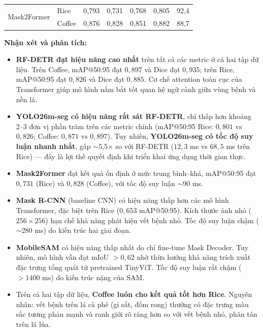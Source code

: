 \begin{table}[H]
{\begin{tabular}{llrrrrr}
            \midrule
            \multirow{2}{*}{Mask2Former}
                             & Rice             & 0,793                        & 0,731                           & 0,768                      & 0,805                      & 92,4                              \\
                             & Coffee           & 0,876                        & 0,828                           & 0,851                      & 0,882                      & 88,7                              \\
            \bottomrule
        \end{tabular}%
    }
    \label{tab:all_test_results}
\end{table}

\textbf{Nhận xét và phân tích:}

\begin{itemize}
    \item \textbf{RF-DETR đạt hiệu năng cao nhất} trên tất cả các metric ở cả hai tập dữ liệu. Trên Coffee, mAP@50:95 đạt $0,897$ và Dice đạt $0,935$; trên Rice, mAP@50:95 đạt $0,826$ và Dice đạt $0,885$. Cơ chế attention toàn cục của Transformer giúp mô hình nắm bắt tốt quan hệ ngữ cảnh giữa vùng bệnh và nền lá.

    \item \textbf{YOLO26m-seg có hiệu năng rất sát RF-DETR}, chỉ thấp hơn khoảng 2--3 đơn vị phần trăm trên các metric chính (mAP@50:95 Rice: $0,801$ vs $0,826$; Coffee: $0,871$ vs $0,897$). Tuy nhiên, \textbf{YOLO26m-seg có tốc độ suy luận nhanh nhất}, gấp $\sim$5,5× so với RF-DETR ($12,3$ ms vs $68,5$ ms trên Rice) --- đây là lợi thế quyết định khi triển khai ứng dụng thời gian thực.

    \item \textbf{Mask2Former} đạt kết quả ổn định ở mức trung bình--khá, mAP@50:95 đạt $0,731$ (Rice) và $0,828$ (Coffee), với tốc độ suy luận $\sim$90 ms.

    \item \textbf{Mask R-CNN} (baseline CNN) có hiệu năng thấp hơn các mô hình Transformer, đặc biệt trên Rice ($0,653$ mAP@50:95). Kích thước ảnh nhỏ ($256 \times 256$) hạn chế khả năng phát hiện vết bệnh nhỏ. Tốc độ suy luận chậm ($\sim$280 ms) do kiến trúc hai giai đoạn.

    \item \textbf{MobileSAM} có hiệu năng thấp nhất do chỉ fine-tune Mask Decoder. Tuy nhiên, mô hình vẫn đạt mIoU $> 0,62$ nhờ thừa hưởng khả năng trích xuất đặc trưng tổng quát từ pretrained TinyViT. Tốc độ suy luận rất chậm ($> 1400$ ms) do kiến trúc nặng của SAM.

    \item Trên cả hai tập dữ liệu, \textbf{Coffee luôn cho kết quả tốt hơn Rice}. Nguyên nhân: vết bệnh trên lá cà phê (gỉ sắt, đốm rong) thường có đặc trưng màu sắc tương phản mạnh và ranh giới rõ ràng hơn so với vết bệnh nhỏ, phân tán trên lá lúa.
\end{itemize}

